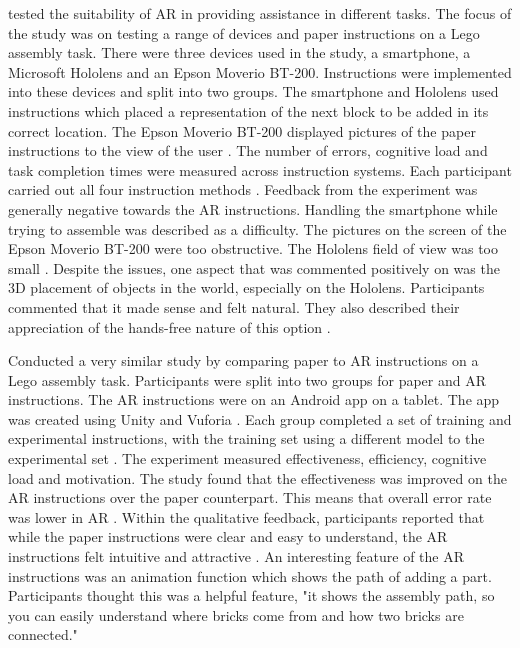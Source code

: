 \documentclass{l4proj}
\begin{document}
\citet{blattgerste_comparing_2017} tested the suitability of AR in providing assistance in different tasks. The focus of the study was on testing a range of devices and paper instructions on a Lego assembly task. There were three devices used in the study, a smartphone, a Microsoft Hololens and an Epson Moverio BT-200. Instructions were implemented into these devices and split into two groups. The smartphone and Hololens used instructions which placed a representation of the next block to be added in its correct location. The Epson Moverio BT-200 displayed pictures of the paper instructions to the view of the user \citep{blattgerste_comparing_2017}. The number of errors, cognitive load and task completion times were measured across instruction systems. Each participant carried out all four instruction methods \citep{blattgerste_comparing_2017}. Feedback from the experiment was generally negative towards the AR instructions. Handling the smartphone while trying to assemble was described as a difficulty. The pictures on the screen of the Epson Moverio BT-200 were too obstructive. The Hololens field of view was too small \citep{blattgerste_comparing_2017}. Despite the issues, one aspect that was commented positively on was the 3D placement of objects in the world, especially on the Hololens. Participants commented that it made sense and felt natural. They also described their appreciation of the hands-free nature of this option \citep{blattgerste_comparing_2017}. 

\citet{yang_comparing_2020} Conducted a very similar study by comparing paper to AR instructions on a Lego assembly task. Participants were split into two groups for paper and AR instructions. The AR instructions were on an Android app on a tablet. The app was created using Unity and Vuforia \citep{yang_comparing_2020}. Each group completed a set of training and experimental instructions, with the training set using a different model to the experimental set \citep{yang_comparing_2020}. The experiment measured effectiveness, efficiency, cognitive load and motivation. The study found that the effectiveness was improved on the AR instructions over the paper counterpart. This means that overall error rate was lower in AR \citep{yang_comparing_2020}. Within the qualitative feedback, participants reported that while the paper instructions were clear and easy to understand, the AR instructions felt intuitive and attractive \citep{yang_comparing_2020}. An interesting feature of the AR instructions was an animation function which shows the path of adding a part. Participants thought this was a helpful feature, "it shows the assembly path, so you can easily understand where bricks come from and how two bricks are connected." \citep{yang_comparing_2020}
\end{document}
